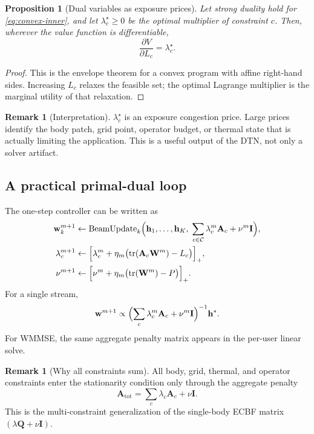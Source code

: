 \documentclass[11pt,a4paper]{article}
\theoremstyle{definition}
\newtheorem{remark}[definition]{Remark}
\theoremstyle{plain}
\newtheorem{proposition}[definition]{Proposition}
\newcommand{\ww}{\mathbf w}
\newcommand{\hh}{\mathbf h}
\newcommand{\W}{\mathbf W}
\newcommand{\Q}{\mathbf Q}
\newcommand{\A}{\mathbf A}
\newcommand{\Id}{\mathbf I}
\newcommand{\Constraints}{\mathcal C}
\newcommand{\tr}{\operatorname{tr}}
\begin{document}
\begin{proposition}[Dual variables as exposure prices]\label{prop:prices}
Let strong duality hold for \eqref{eq:convex-inner}, and let
$\lambda_c^\star\ge0$ be the optimal multiplier of constraint $c$.
Then, wherever the value function is differentiable,
\begin{equation}\label{eq:price}
  \frac{\partial V}{\partial L_c}=\lambda_c^\star.
\end{equation}
\end{proposition}

\begin{proof}
This is the envelope theorem for a convex program with affine right-hand
sides.  Increasing $L_c$ relaxes the feasible set; the optimal Lagrange
multiplier is the marginal utility of that relaxation.
\end{proof}

\begin{remark}[Interpretation]
$\lambda_c^\star$ is an exposure congestion price.  Large prices identify
the body patch, grid point, operator budget, or thermal state that is
actually limiting the application.  This is a useful output of the DTN,
not only a solver artifact.
\end{remark}

\subsection{A practical primal-dual loop}

The one-step controller can be written as
\begin{align}
  \ww_k^{m+1}
  &\leftarrow
  \operatorname{BeamUpdate}_k
  \Bigl(\hh_1,\ldots,\hh_K,\;
  \sum_{c\in\Constraints}\lambda_c^m\A_c+\nu^m\Id\Bigr),
  \label{eq:beam-update}\\
  \lambda_c^{m+1}
  &\leftarrow
  \Bigl[\lambda_c^m+\eta_m\bigl(\tr(\A_c\W^m)-L_c\bigr)\Bigr]_+,
  \label{eq:dual-update}\\
  \nu^{m+1}
  &\leftarrow
  \Bigl[\nu^m+\eta_m\bigl(\tr(\W^m)-P\bigr)\Bigr]_+.
  \label{eq:power-update}
\end{align}
For a single stream,
\begin{equation}\label{eq:single-stream-update}
  \ww^{m+1}\propto
  \Bigl(\sum_c\lambda_c^m\A_c+\nu^m\Id\Bigr)^{-1}\hh^*.
\end{equation}
For WMMSE, the same aggregate penalty matrix appears in the per-user
linear solve.

\begin{remark}[Why all constraints sum]
All body, grid, thermal, and operator constraints enter the stationarity
condition only through the aggregate penalty
\[
  \A_{\mathrm{tot}}=\sum_c\lambda_c\A_c+\nu\Id.
\]
This is the multi-constraint generalization of the single-body ECBF
matrix $(\lambda\Q+\nu\Id)$.
\end{remark}
\end{document}

